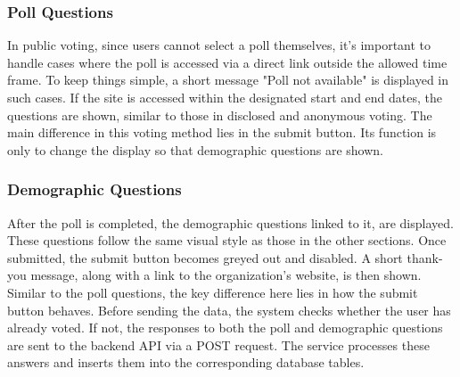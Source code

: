\documentclass[a4paper,12pt]{report}
\begin{document}
\subsubsection{Poll Questions}
In public voting, since users cannot select a poll themselves, it's important to handle cases where the poll is accessed via a direct link outside the allowed time frame. To keep things simple, a short message "Poll not available" is displayed in such cases. If the site is accessed within the designated start and end dates, the questions are shown, similar to those in disclosed and anonymous voting. The main difference in this voting method lies in the submit button. Its function is only to change the display so that demographic questions are shown.

\subsubsection{Demographic Questions}
After the poll is completed, the demographic questions linked to it, are displayed. These questions follow the same visual style as those in the other sections. Once submitted, the submit button becomes greyed out and disabled. A short thank-you message, along with a link to the organization's website, is then shown. Similar to the poll questions, the key difference here lies in how the submit button behaves. Before sending the data, the system checks whether the user has already voted. If not, the responses to both the poll and demographic questions are sent to the backend API via a POST request. The service processes these answers and inserts them into the corresponding database tables.
\end{document}
